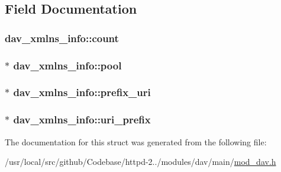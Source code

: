 \subsection{Field Documentation}
\subsubsection[{\texorpdfstring{count}{count}}]{ dav\+\_\+xmlns\+\_\+info\+::count}\hypertarget{structdav__xmlns__info_a75b9d349015cbd77c18ac27e71d4620f}{}\label{structdav__xmlns__info_a75b9d349015cbd77c18ac27e71d4620f}
\subsubsection[{\texorpdfstring{pool}{pool}}]{$\ast$ dav\+\_\+xmlns\+\_\+info\+::pool}\hypertarget{structdav__xmlns__info_a15aaec541bb2555f63e3642e614da271}{}\label{structdav__xmlns__info_a15aaec541bb2555f63e3642e614da271}
\subsubsection[{\texorpdfstring{prefix\+\_\+uri}{prefix_uri}}]{$\ast$ dav\+\_\+xmlns\+\_\+info\+::prefix\+\_\+uri}\hypertarget{structdav__xmlns__info_a79e095ca0ae40a73a4f5f7d69c7a44b4}{}\label{structdav__xmlns__info_a79e095ca0ae40a73a4f5f7d69c7a44b4}
\subsubsection[{\texorpdfstring{uri\+\_\+prefix}{uri_prefix}}]{$\ast$ dav\+\_\+xmlns\+\_\+info\+::uri\+\_\+prefix}\hypertarget{structdav__xmlns__info_a6668ca67200de693d23df0333a8ad6d8}{}\label{structdav__xmlns__info_a6668ca67200de693d23df0333a8ad6d8}


The documentation for this struct was generated from the following file\+:\begin{DoxyCompactItemize}
\item 
/usr/local/src/github/\+Codebase/httpd-\/2../modules/dav/main/\hyperlink{mod__dav_8h}{mod\+\_\+dav.\+h}\end{DoxyCompactItemize}

